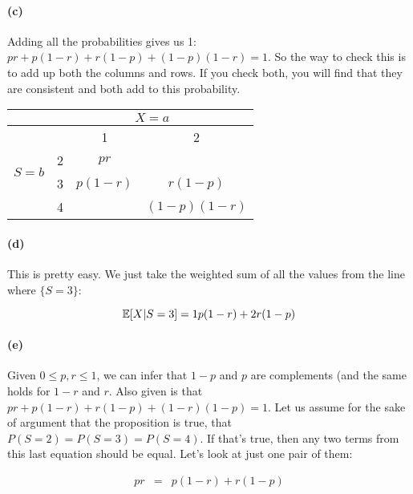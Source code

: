 \documentclass[a4paper]{article}
\begin{document}
\paragraph{(c)}

Adding all the probabilities gives us 1: $pr + p(1-r) + r(1-p) + (1-p)(1-r) = 1$. So the way to check this is to add up both the columns and rows. If you check both, you will find that they are consistent and both add to this probability. \\

\renewcommand\arraystretch{1.5}
\begin{tabular}{ c | c | c | c }
& \multicolumn{3}{c}{$X = a$} \\
\hline
\multirow{4}{*}{$S=b$} & & 1 & 2 \\
\cline{2-4}
& 2 & $pr$ & \\
\cline{2-4}
& 3 & $p(1-r)$ & $r(1-p)$  \\
\cline{2-4}
& 4 & & $(1-p)(1-r)$ \\
\end{tabular}

\paragraph{(d)}

This is pretty easy. We just take the weighted sum of all the values from the line where $\{S = 3\}$:

\begin{equation}
\mathbb{E}[X | S = 3] = 1p(1-r) + 2r(1-p)
\end{equation}

\paragraph{(e)}

Given $0 \le p, r \le 1$, we can infer that $1-p$ and $p$ are complements (and the same holds for $1-r$ and $r$. Also given is that $pr + p(1-r) + r(1-p) + (1-r)(1-p) = 1$. Let us assume for the sake of argument that the proposition is true, that $P(S=2) = P(S=3) = P(S=4)$. If that's true, then any two terms from this last equation should be equal. Let's look at just one pair of them:

\begin{equation}
\begin{array}{rcl}
pr & = & p(1-r) + r(1-p)
\end{array}
\end{equation}
\end{document}
